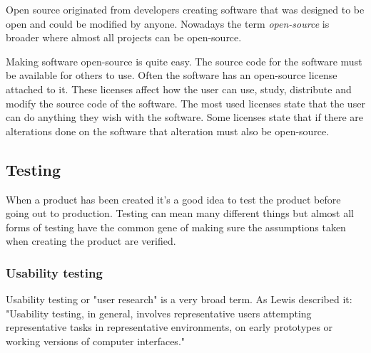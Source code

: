 Open source originated from developers creating software that was designed to be open and could be modified by anyone. Nowadays the term \textit{open-source} is broader where almost all projects can be open-source. 

Making software open-source is quite easy. The source code for the software must be available for others to use. Often the software has an open-source license attached to it. These licenses affect how the user can use, study, distribute and modify the source code of the software. The most used licenses state that the user can do anything they wish with the software. Some licenses state that if there are alterations done on the software that alteration must also be open-source.







\subsection{Testing}%
\label{sub:Testing}
When a product has been created it's a good idea to test the product before going out to production. Testing can mean many different things but almost all forms of testing have the common gene of making sure the assumptions taken when creating the product are verified. 

\subsubsection{Usability testing}%
\label{ssub:User testing}
Usability testing or "user research" is a very broad term. As Lewis \cite{lewis2006usability} described it: "Usability testing, in general, involves representative users attempting representative tasks in representative environments, on early prototypes or working versions of computer interfaces."

